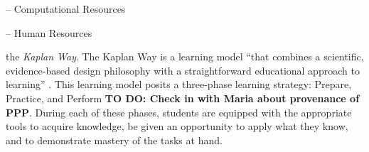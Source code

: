 \documentclass[
  12pt]{article}
\begin{document}
-- Computational Resources

-- Human Resources

\newpage

the \emph{Kaplan Way}. The Kaplan Way is a learning model ``that
combines a scientific, evidence-based design philosophy with a
straightforward educational approach to learning''
\citep{schweser_2023}. This learning model posits a three-phase learning
strategy: Prepare, Practice, and Perform \textbf{TO DO: Check in with
Maria about provenance of PPP}. During each of these phases, students
are equipped with the appropriate tools to acquire knowledge, be given
an opportunity to apply what they know, and to demonstrate mastery of
the tasks at hand.


  
\end{document}
